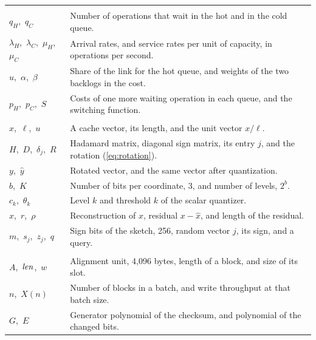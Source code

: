 \begin{tightblock}
\begin{longtable}{L{3.9cm}L{11.2cm}}
  \addlinespace
   \\*
  $q_H$,\ $q_C$ & Number of operations that wait in the hot and in the cold queue. \\
  $\lambda_H$,\ $\lambda_C$,\ $\mu_H$,\ $\mu_C$ & Arrival rates, and service rates per unit of capacity, in operations per second. \\
  $u$,\ $\alpha$,\ $\beta$ & Share of the link for the hot queue, and weights of the two backlogs in the cost. \\
  $p_H$,\ $p_C$,\ $S$ & Costs of one more waiting operation in each queue, and the switching function. \\
  \addlinespace
   \\*
  $x$,\ $\ell$,\ $u$ & A cache vector, its length, and the unit vector $x / \ell$. \\
  $H$,\ $D$,\ $\delta_j$,\ $R$ & Hadamard matrix, diagonal sign matrix, its entry $j$, and the rotation (\cref{eq:rotation}). \\
  $y$,\ $\hat y$ & Rotated vector, and the same vector after quantization. \\
  $b$,\ $K$ & Number of bits per coordinate, 3, and number of levels, $2^b$. \\
  $c_k$,\ $\theta_k$ & Level $k$ and threshold $k$ of the scalar quantizer. \\
  $\hat x$,\ $r$,\ $\rho$ & Reconstruction of $x$, residual $x - \hat x$, and length of the residual. \\
  $m$,\ $s_j$,\ $z_j$,\ $q$ & Sign bits of the sketch, 256, random vector $j$, its sign, and a query. \\
  \addlinespace
   \\*
  $A$,\ $\mathit{len}$,\ $w$ & Alignment unit, 4,096 bytes, length of a block, and size of its slot. \\
  $n$,\ $X(n)$ & Number of blocks in a batch, and write throughput at that batch size. \\
  $G$,\ $E$ & Generator polynomial of the checksum, and polynomial of the changed bits. \\
  \bottomrule
\end{longtable}
\end{tightblock}
